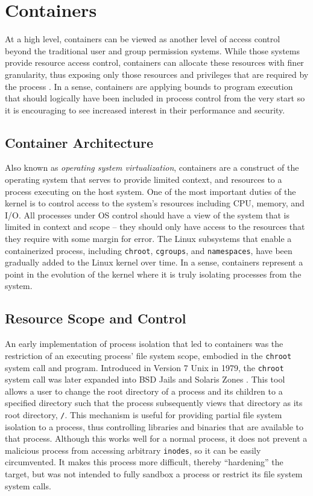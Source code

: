 \section{Containers}
\label{sec:containers}
At a high level, containers can be viewed as another level of access control beyond the traditional user and group permission systems. 
While those systems provide resource access control, containers can allocate these resources with finer granularity, thus exposing only those resources and privileges that are required by the process \autocite{_felter_1}. 
In a sense, containers are applying bounds to program execution that should logically have been included in process control from the very start so it is encouraging to see increased interest in their performance and security.

\subsection{Container Architecture}
\label{sec:containerarchitecture}
Also known as \emph{operating system virtualization}, containers are a construct of the operating system that serves to provide limited context, and resources to a process executing on the host system. 
One of the most important duties of the kernel is to control access to the system's resources including CPU, memory, and I/O.  
All processes under OS control should have a view of the system that is limited in context and scope -- they should only have access to the resources that they require with some margin for error.  
The Linux subsystems that enable a containerized process, including \texttt{chroot}, \texttt{cgroups}, and \texttt{namespaces}, have been gradually added to the Linux kernel over time.
In a sense, containers represent a point in the evolution of the kernel where it is truly isolating processes from the system. 


\subsection{Resource Scope and Control}
\label{sec:resource_scope_control}
An early implementation of process isolation that led to containers was the restriction of an executing process' file system scope, embodied in the \texttt{chroot} system call and program. 
Introduced in Version 7 Unix in 1979, the \texttt{chroot} system call was later expanded into BSD Jails and Solaris Zones \autocite{_zones_1}.
This tool allows a user to change the root directory of a process and its children to a specified directory such that the process subsequently views that directory as its root directory, \texttt{/}.  
This mechanism is useful for providing partial file system isolation to a process, thus controlling libraries and binaries that are available to that process.
Although this works well for a normal process, it does not prevent a malicious process from accessing arbitrary \texttt{inodes}, so it can be easily circumvented.
It makes this process more difficult, thereby ``hardening'' the target, but was not intended to fully sandbox a process or restrict its file system system calls.

